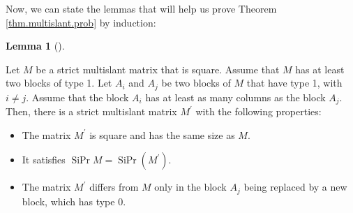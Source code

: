 \documentclass[numbers=enddot,12pt,final,onecolumn,notitlepage]{scrartcl}%
\theoremstyle{definition}
\newtheorem{lem}[theo]{Lemma}
\newenvironment{lemma}[1][]
{\begin{lem}[#1]\begin{leftbar}}
{\end{leftbar}\end{lem}}
\theoremstyle{plainsl}
\begin{document}
Now, we can state the lemmas that will help us prove Theorem
\ref{thm.multislant.prob} by induction:

\begin{lemma}
\label{lem.multislant.red11}Let $M$ be a strict multislant matrix that is
square. Assume that $M$ has at least two blocks of type 1. Let $A_{i}$ and
$A_{j}$ be two blocks of $M$ that have type 1, with $i\neq j$. Assume that the
block $A_{i}$ has at least as many columns as the block $A_{j}$. Then, there
is a strict multislant matrix $M^{\prime}$ with the following properties:

\begin{itemize}
\item The matrix $M^{\prime}$ is square and has the same size as $M$.

\item It satisfies $\operatorname*{SiPr}M=\operatorname*{SiPr}\left(
M^{\prime}\right)  $.

\item The matrix $M^{\prime}$ differs from $M$ only in the block $A_{j}$ being
replaced by a new block, which has type 0.
\end{itemize}
\end{lemma}
\end{document}
